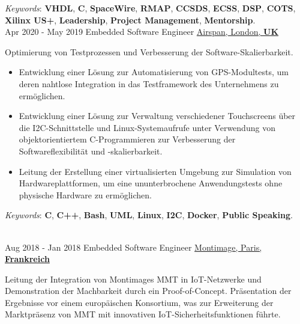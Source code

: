 \documentclass[letterpaper]{twentysecondcv} %
\begin{document}
\begin{twenty}
{            \vspace{1 mm}
            \textit{Keywords}: \textbf{VHDL}, \textbf{C}, \textbf{SpaceWire}, \textbf{RMAP}, \textbf{CCSDS}, \textbf{ECSS}, \textbf{DSP}, \textbf{COTS}, \textbf{Xilinx US+}, \textbf{Leadership}, \textbf{Project Management}, \textbf{Mentorship}.
        }\\
    \twentyitem
    	{Apr 2020 -}
		{May 2019}
        {Embedded Software Engineer}
        {\href{https://www.airspan.com/}{Airspan, London, \textbf{UK}}}
        {}
        {
            Optimierung von Testprozessen und Verbesserung der Software-Skalierbarkeit.
            \vspace{1 mm}
            \begin{itemize}
                \item Entwicklung einer Lösung zur Automatisierung von GPS-Modultests, um deren nahtlose Integration in das Testframework des Unternehmens zu ermöglichen.
                \item Entwicklung einer Lösung zur Verwaltung verschiedener Touchscreens über die I2C-Schnittstelle und Linux-Systemaufrufe unter Verwendung von objektorientiertem C-Programmieren zur Verbesserung der Softwareflexibilität und -skalierbarkeit.
                \item Leitung der Erstellung einer virtualisierten Umgebung zur Simulation von Hardwareplattformen, um eine ununterbrochene Anwendungstests ohne physische Hardware zu ermöglichen.
            \end{itemize}

            \vspace{1 mm}
            \textit{Keywords}: \textbf{C}, \textbf{C++}, \textbf{Bash}, \textbf{UML}, \textbf{Linux}, \textbf{I2C}, \textbf{Docker}, \textbf{Public Speaking}.
        }\\
    \twentyitem
        {Aug 2018 -}
    	{Jan 2018}
        {Embedded Software Engineer}
        {\href{https://www.montimage.com/}{Montimage, Paris, \textbf{Frankreich}}}
        {}
        {
            Leitung der Integration von Montimages MMT in IoT-Netzwerke und Demonstration der Machbarkeit durch ein Proof-of-Concept. Präsentation der Ergebnisse vor einem europäischen Konsortium, was zur Erweiterung der Marktpräsenz von MMT mit innovativen IoT-Sicherheitsfunktionen führte.


        }
\end{twenty}

\newpage
\makeextrainfo %
\end{document}
